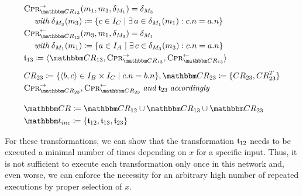 \begin{align*}
    & 
    \consistencypreservationrule{\consistencyrelationset{CR}_{13}}^{\rightarrow}(\model{m}{1}, \model{m}{3}, \change{\metamodel{M}{1}}) = \change{\metamodel{M}{3}} \\
    & \formulaskip
    \withmath \change{\metamodel{M}{3}}(\model{m}{3}) \equalsperdefinition \setted{c \in \instances{\class{C}{}} \mid \exists a \in \change{\metamodel{M}{1}}(\model{m}{1}) : c.n = a.n} \\
    & 
    \consistencypreservationrule{\consistencyrelationset{CR}_{13}}^{\leftarrow}(\model{m}{3}, \model{m}{1}, \change{\metamodel{M}{3}}) = \change{\metamodel{M}{1}} \\
    & \formulaskip
    \withmath \change{\metamodel{M}{1}}(\model{m}{1}) \equalsperdefinition \setted{a \in \instances{\class{A}{}} \mid \exists c \in \change{\metamodel{M}{3}}(\model{m}{3}) : c.n = a.n} \\
    & 
    \transformation{t}_{13} \equalsperdefinition \tupled{\consistencyrelationset{CR}_{13}, \consistencypreservationrule{\consistencyrelationset{CR}_{13}}^{\rightarrow}, \consistencypreservationrule{\consistencyrelationset{CR}_{13}}^{\leftarrow}} \\[0.5em]
    &
    \consistencyrelation{CR}{23} \equalsperdefinition \setted{\tupled{b,c} \in \instances{\class{B}{}} \times \instances{\class{C}{}} \mid c.n = b.n}, \consistencyrelationset{CR}_{23} \equalsperdefinition \setted{\consistencyrelation{CR}{23}, \consistencyrelation{CR}{23}^T} \\
    & 
    \consistencypreservationrule{\consistencyrelationset{CR}_{23}}^{\rightarrow}, \consistencypreservationrule{\consistencyrelationset{CR}_{23}}^{\leftarrow} \andmath \transformation{t}_{23} \mathtextspacearound{accordingly} \\[1em]
    &
    \consistencyrelationset{CR} \equalsperdefinition \consistencyrelationset{CR}_{12} \cup \consistencyrelationset{CR}_{13} \cup \consistencyrelationset{CR}_{23} \\
    &
    \transformationset{T}_\mathvariable{inc} \equalsperdefinition \setted{\transformation{t}_{12}, \transformation{t}_{13}, \transformation{t}_{23}}
\end{align*}

For these transformations, we can show that the transformation $\transformation{t}_{12}$ needs to be executed a minimal number of times depending on $x$ for a specific input.
Thus, it is not sufficient to execute each transformation only once in this network and, even worse, we can enforce the necessity for an arbitrary high number of repeated executions by proper selection of $x$.


